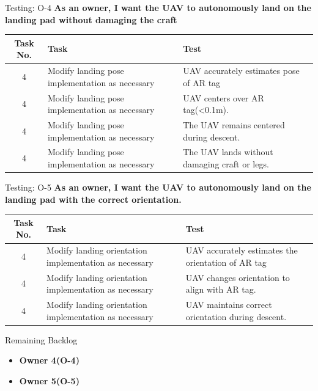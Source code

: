 \documentclass[11pt]{beamer}
\begin{document}
\begin{frame}{Testing: O-4}
	\textbf{As an owner, I want the UAV to autonomously land on the landing pad without damaging the craft}
	\begin{tabular}{| c | >{\raggedright}m{4cm} | m{4cm} | m{4cm} |}\hline
		Task No. & Task & Test \\\hline
		4 & Modify landing pose implementation as necessary & UAV accurately estimates pose of AR tag\\\hline
		4 & Modify landing pose implementation as necessary & UAV centers over AR tag(\textless 0.1m).\\\hline
		4 & Modify landing pose implementation as necessary & The UAV remains centered during descent.\\\hline
		4 & Modify landing pose implementation as necessary & The UAV lands without damaging craft or legs.\\\hline
		
	\end{tabular}
\end{frame}
\begin{frame}{Testing: O-5}
\textbf{As an owner, I want the UAV to autonomously land on the landing pad with the correct orientation.}
\begin{tabular}{| c | >{\raggedright}m{4cm} | m{4cm} | m{4cm} |}\hline
	Task No. & Task & Test\\\hline
		4 & Modify landing orientation implementation as necessary & UAV accurately estimates the orientation of AR tag\\\hline
		4 & Modify landing orientation implementation as necessary & UAV changes orientation to align with AR tag.\\\hline
		4 & Modify landing orientation implementation as necessary & UAV maintains correct orientation during descent.\\\hline
\end{tabular}
\end{frame}

\begin{frame}{Remaining Backlog}
\begin{itemize}
\item \textbf{Owner 4(O-4)}
\item \textbf{Owner 5(O-5)}
\end{itemize}

\end{frame}
\end{document}
